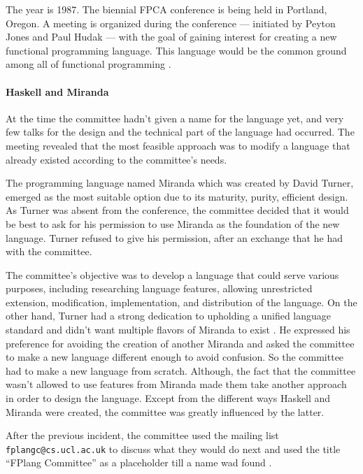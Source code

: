 \documentclass[a4paper, titlepage, twoside]{article}
\begin{document}
The year is 1987. The biennial FPCA conference is being held in Portland, Oregon. A meeting is organized during the conference --- initiated by Peyton Jones and Paul Hudak --- with the goal of gaining interest for creating a new functional programming language. This language would be the common ground among all of functional programming \autocite{hudakHistoryHaskellBeing2007}.

\paragraph*{Haskell and Miranda}
\label{sec:org2a8d5b0}

At the time the committee hadn't given a name for the language yet, and very few talks for the design and the technical part of the language had occurred. The meeting revealed that the most feasible approach was to modify a language that already existed according to the committee's needs.

The programming language named Miranda \autocite{turnerMirandaNonstrictFunctional1985} which was created by David Turner, emerged as the most suitable option due to its maturity, purity, efficient design. As Turner was absent from the conference, the committee decided that it would be best to ask for his permission to use Miranda as the foundation of the new language. Turner refused to give his permission, after an exchange that he had with the committee.

The committee's objective was to develop a language that could serve various purposes, including researching language features, allowing unrestricted extension, modification, implementation, and distribution of the language. On the other hand, Turner had a strong dedication to upholding a unified language standard and didn't want multiple flavors of Miranda to exist \autocite{hudakHistoryHaskellBeing2007}. He expressed his preference for avoiding the creation of another Miranda and asked the committee to make a new language different enough to avoid confusion. So the committee had to make a new language from scratch. Although, the fact that the committee wasn't allowed to use features from Miranda made them take another approach in order to design the language. Except from the different ways Haskell and Miranda were created, the committee was greatly influenced by the latter.

After the previous incident, the committee used the mailing list \texttt{fplangc@cs.ucl.ac.uk} to discuss what they would do next and used the title ``FPlang Committee'' as a placeholder till a name wad found \autocite{hudakHistoryHaskellBeing2007}.
\end{document}
